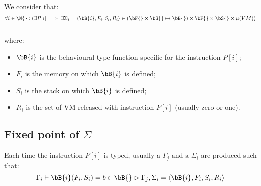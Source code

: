 We consider that:\\
\[\forall i \in \N{}: (\exists P[i] \implies \exists \Sigma_i = \langle \bB{i}, F_i, S_i, R_i\rangle \in (\bF{} \times \bS{} \mapsto \bB{}) \times \bF{} \times \bS{} \times \wp(VM))\]\\
where:
\begin{itemize}
\item $\bB{i}$ is the behavioural type function specific for the instruction $P[i]$;
\item $F_i$ is the memory on which $\bB{i}$ is defined;
\item $S_i$ is the stack on which $\bB{i}$ is defined;
\item $R_i$ is the set of VM released with instruction $P[i]$ (usually zero or one).
\end{itemize}


\subsection{Fixed point of $\Sigma$}

Each time the instruction $P[i]$ is typed, usually a $\Gamma_{j} \text{ and a }\Sigma_i$ are produced such that:
\[\Gamma_i \vdash \bB{i}(F_i, S_i) = b \in \bB{} \rhd \Gamma_{j}, \Sigma_i = \langle \bB{i}, F_i, S_i, R_i \rangle\]

